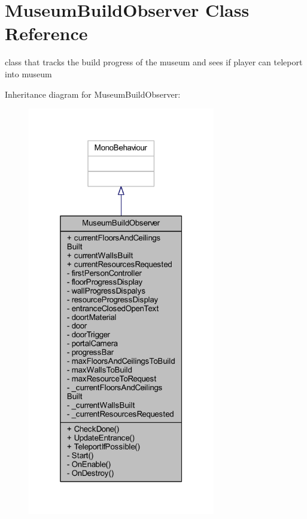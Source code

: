 \hypertarget{class_museum_build_observer}{}\section{Museum\+Build\+Observer Class Reference}
\label{class_museum_build_observer}


class that tracks the build progress of the museum and sees if player can teleport into museum  




Inheritance diagram for Museum\+Build\+Observer\+:
\nopagebreak
\begin{figure}[H]
\begin{center}
\leavevmode
\includegraphics[width=232pt]{class_museum_build_observer__inherit__graph}
\end{center}
\end{figure}


